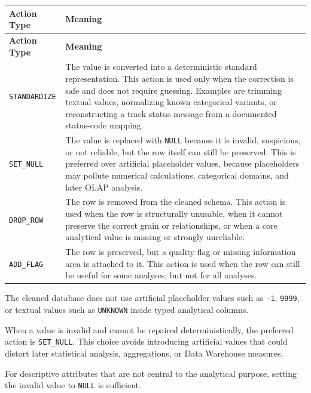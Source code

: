 \documentclass[a4paper,11pt]{article}
\begin{document}
	
	\begin{longtable}{p{4cm}p{10cm}}
		\toprule
		\textbf{Action Type} & \textbf{Meaning} \\
		\midrule
		\endfirsthead
		
		\toprule
		\textbf{Action Type} & \textbf{Meaning} \\
		\midrule
		\endhead
		
		\texttt{STANDARDIZE}
		& The value is converted into a deterministic standard representation.
		This action is used only when the correction is safe and does not require guessing.
		Examples are trimming textual values, normalizing known categorical variants, or reconstructing a track status message from a documented status-code mapping. \\
		\midrule
		
		\texttt{SET\_NULL}
		& The value is replaced with \texttt{NULL} because it is invalid, suspicious, or not reliable, but the row itself can still be preserved.
		This is preferred over artificial placeholder values, because placeholders may pollute numerical calculations, categorical domains, and later OLAP analysis. \\
		\midrule
		
		\texttt{DROP\_ROW}
		& The row is removed from the cleaned schema.
		This action is used when the row is structurally unusable, when it cannot preserve the correct grain or relationships, or when a core analytical value is missing or strongly unreliable. \\
		\midrule
		
		\texttt{ADD\_FLAG}
		& The row is preserved, but a quality flag or missing information area is attached to it.
		This action is used when the row can still be useful for some analyses, but not for all analyses. \\
		\bottomrule
	\end{longtable}
	
	The cleaned database does not use artificial placeholder values such as
	\texttt{-1}, \texttt{9999}, or textual values such as \texttt{UNKNOWN}
	inside typed analytical columns.
	
	When a value is invalid and cannot be repaired deterministically, the preferred
	action is \texttt{SET\_NULL}. This choice avoids introducing artificial values
	that could distort later statistical analysis, aggregations, or Data Warehouse
	measures.
	
	For descriptive attributes that are not central to the analytical purpose, setting
	the invalid value to \texttt{NULL} is sufficient.
	
\end{document}
